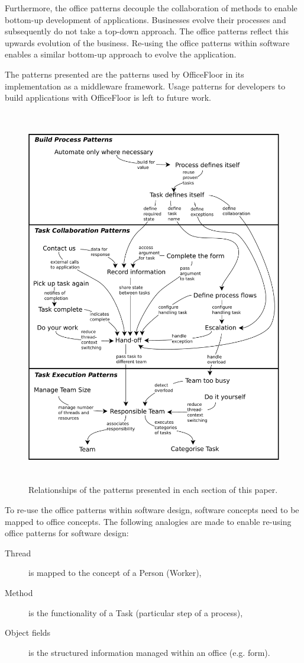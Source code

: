 \documentclass[prodmode]{style/acmlarge}
\begin{document}
Furthermore, the office patterns decouple the collaboration of methods to
enable bottom-up development of applications.  Businesses evolve their processes
and subsequently do not take a top-down approach.  The office patterns reflect
this upwards evolution of the business.  Re-using the office patterns within
software enables a similar bottom-up approach to evolve the application.

The patterns presented are the patterns used by OfficeFloor in its
implementation as a middleware framework.  Usage patterns for developers to
build applications with OfficeFloor is left to future work.

\begin{figure}[!t]
\centering
\includegraphics[height=6.5in]{PatternRelationships}
\caption{Relationships of the patterns presented in each section of this paper.}
\label{fig:PatternRelationships}
\end{figure}

To re-use the office patterns within software design, software concepts need to be
mapped to office concepts.  The following analogies are made to enable
re-using office patterns for software design:
\begin{description}
  \item[Thread] is mapped to the concept of a Person (Worker),
  \item[Method] is the functionality of a Task (particular step of a process),
  \item[Object fields] is the structured information managed within an office (e.g. form).
\end{description}
\end{document}
